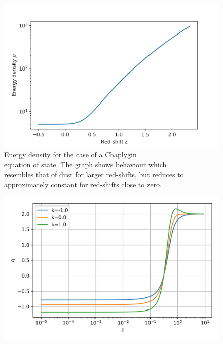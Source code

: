 \documentclass[a0,portrait]{a0poster}
\renewcommand{\baselinestretch}{0.85}
\begin{document}
\begin{multicols}{2}
\noindent
\begin{minipage}{.24\textwidth}
\begin{figure}[H]
\centering
\includegraphics[scale=0.8]{Figures/ch_rho.jpg}
\renewcommand{\baselinestretch}{0.5}
\caption{Energy density for the case of a Chaplygin\\ equation of state. The graph shows behaviour which\\ resembles that of dust for larger red-shifts, but reduces to\\ approximately constant for red-shifts close to zero.}
\label{fig:ChRho}
\end{figure}
\end{minipage}%
\begin{minipage}{.24\textwidth}
\vspace{50pt}
\begin{figure}[H]
\centering
\includegraphics[scale=0.8]{Figures/ch_q.jpg}

\end{figure}
\end{minipage}
\end{multicols}
\end{document}
